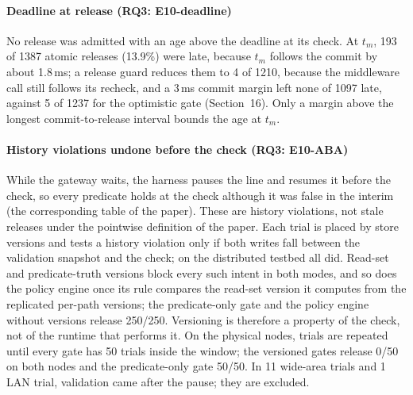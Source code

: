 \documentclass[11pt]{article}
\begin{document}
\paragraph{Deadline at release (RQ3: E10-deadline)}
No release was admitted with an age above the deadline at its check. At $t_m$, 193 of 1387 atomic releases (13.9\%) were late, because $t_m$ follows the commit by about 1.8\,ms; a release guard reduces them to 4 of 1210, because the middleware call still follows its recheck, and a 3\,ms commit margin left none of 1097 late, against 5 of 1237 for the optimistic gate (Section~16). Only a margin above the longest commit-to-release interval bounds the age at $t_m$.

\paragraph{History violations undone before the check (RQ3: E10-ABA)}
While the gateway waits, the harness pauses the line and resumes it before the check, so every predicate holds at the check although it was false in the interim (the corresponding table of the paper). These are history violations, not stale releases under the pointwise definition of the paper. Each trial is placed by store versions and tests a history violation only if both writes fall between the validation snapshot and the check; on the distributed testbed all did. Read-set and predicate-truth versions block every such intent in both modes, and so does the policy engine once its rule compares the read-set version it computes from the replicated per-path versions; the predicate-only gate and the policy engine without versions release 250/250. Versioning is therefore a property of the check, not of the runtime that performs it. On the physical nodes, trials are repeated until every gate has 50 trials inside the window; the versioned gates release 0/50 on both nodes and the predicate-only gate 50/50. In 11 wide-area trials and 1 LAN trial, validation came after the pause; they are excluded.
\end{document}
